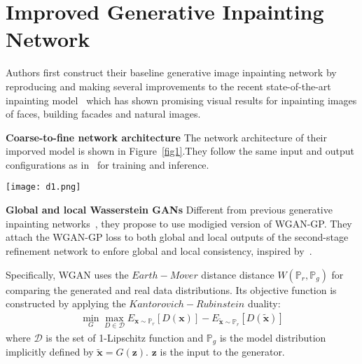 \documentclass[10pt,twocolumn,letterpaper]{article}
\begin{document}
\section{Improved Generative Inpainting Network}

Authors first construct their baseline generative image inpainting network by reproducing and making several improvements to the recent state-of-the-art inpainting model~\cite{17} which has shown promising visual results for inpainting images of faces, building facades and natural images. 

{\bf Coarse-to-fine network architecture} The network architecture of their imporved model is shown in Figure~\ref{fig1}.They follow the same input and output configurations as in~\cite{17} for training and inference.

\begin{figure*}
\begin{center}
\texttt{[image: d1.png]}
\end{center}
\caption{Overview of the improved generative inpainting framework. The coarse network is trained with reconstruction loss explicitly, while the refinement network is trained with reconstruction loss, global and local WGAN-GP adversarial loss.}
\label{fig1}
\end{figure*}

{\bf Global and local Wasserstein GANs} Different from previous generative inpainting networks~\cite{17}, they propose to use modigied version of WGAN-GP. They attach the WGAN-GP loss to both global and local outputs of the second-stage refinement network to enfore global and local consistency, inspired by~\cite{17}.

Specifically, WGAN uses the $Earth-Mover$ distance distance $W(\mathbb{P}_r, \mathbb{P}_g)$ for comparing the generated and real data distributions. Its objective function is constructed by applying the $Kantorovich-Rubinstein$ duality:
\begin{gather}
\mathop{\min}\limits_G\mathop{\max}\limits_{D\in \mathcal{D}}E_{\mathbf{x}\sim{\mathbb{P}_r}}[D(\mathbf{x})] - E_{\tilde{\mathbf{x}}\sim{\mathbb{P}_r}}[D(\tilde{\mathbf{x}})]
\end{gather}
where $\mathcal{D}$ is the set of 1-Lipschitz function and $\mathbb{P}_g$ is the model distribution implicitly defined by $\tilde{\mathbf{x}} = G(\mathbf{z})$. $\mathbf{z}$ is the input to the generator.
\end{document}
